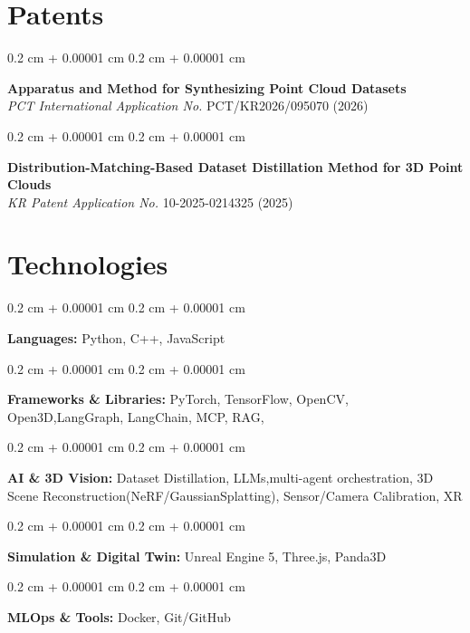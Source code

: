 \documentclass[10pt, letterpaper]{article}
\newenvironment{onecolentry}{
    \begin{adjustwidth}{
        0.2 cm + 0.00001 cm
    }{
        0.2 cm + 0.00001 cm
    }
}{
    \end{adjustwidth}
} %
\begin{document}
    \vspace{0.2 cm}
    \section{Patents}
    \begin{onecolentry}
        \textbf{Apparatus and Method for Synthesizing Point Cloud Datasets} \\
        \emph{PCT International Application No.} PCT/KR2026/095070 (2026)
    \end{onecolentry}
    \begin{onecolentry}
        \textbf{Distribution-Matching-Based Dataset Distillation Method for 3D Point Clouds} \\
        \emph{KR Patent Application No.} 10-2025-0214325 (2025)
    \end{onecolentry}

    \vspace{0.2 cm}

    \section{Technologies}

    \begin{onecolentry}
        \textbf{Languages:} Python, C++, JavaScript
    \end{onecolentry}
    
    \begin{onecolentry}
        \textbf{Frameworks \& Libraries:} PyTorch, TensorFlow, OpenCV, Open3D,LangGraph, LangChain, MCP, RAG, 
    \end{onecolentry}
    
    \begin{onecolentry}
        \textbf{AI \& 3D Vision:} Dataset Distillation, LLMs,multi-agent orchestration, 3D Scene Reconstruction(NeRF/GaussianSplatting), Sensor/Camera Calibration, XR
    \end{onecolentry}
    
    \begin{onecolentry}
        \textbf{Simulation \& Digital Twin:} Unreal Engine 5, Three.js, Panda3D
    \end{onecolentry}

    \begin{onecolentry}
        \textbf{MLOps \& Tools:} Docker, Git/GitHub
    \end{onecolentry}
\end{document}
